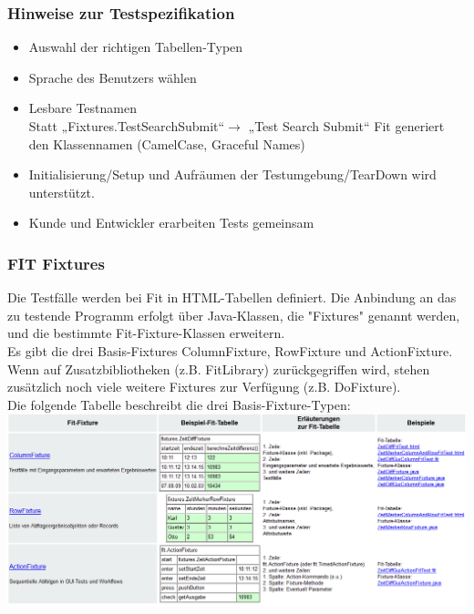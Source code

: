 \documentclass[a4paper,10pt]{article}
\begin{document}
\subsubsection{Hinweise zur Testspezifikation}
\begin{itemize}
\item Auswahl der richtigen Tabellen-Typen
\item Sprache des Benutzers wählen
\item Lesbare Testnamen\\
Statt „Fixtures.TestSearchSubmit“$ \rightarrow$ „Test Search Submit“
Fit generiert den Klassennamen (CamelCase, Graceful Names)
\item Initialisierung/Setup und Aufräumen der Testumgebung/TearDown wird unterstützt.
\item Kunde und Entwickler erarbeiten Tests gemeinsam
\end{itemize}
\newpage
\subsubsection{FIT Fixtures}
Die Testf\"alle werden bei Fit in HTML-Tabellen definiert. Die Anbindung an das zu testende Programm erfolgt über Java-Klassen, die "Fixtures" genannt werden, und die bestimmte Fit-Fixture-Klassen erweitern.\\
Es gibt die drei Basis-Fixtures ColumnFixture, RowFixture und ActionFixture. Wenn auf Zusatzbibliotheken (z.B. FitLibrary) zurückgegriffen wird, stehen zus\"atzlich noch viele weitere Fixtures zur Verfügung (z.B. DoFixture).\\
Die folgende Tabelle beschreibt die drei Basis-Fixture-Typen:\\
\includegraphics[scale=0.55]{FIT_Fixtures.png}
\end{document}
